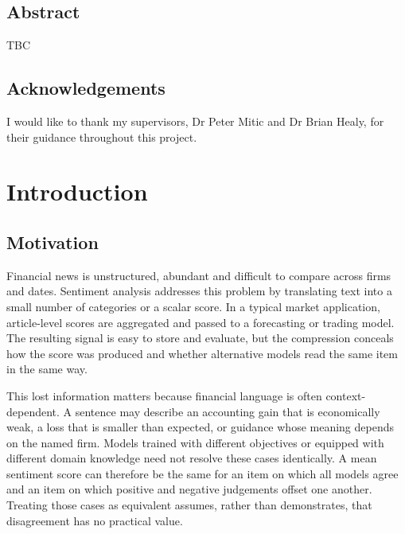 \documentclass[11pt,a4paper,oneside]{book}
\newif\ifshowdraftnotes
\newcommand{\draftnote}[1]{%
  \ifshowdraftnotes
    \par\smallskip
    \noindent{\color{draftgrey}\small\itshape Drafting note: #1\par}
    \smallskip
  \fi
}
\begin{document}
\section*{Abstract}

TBC

\draftnote{Add the final sample sizes, principal effect estimates, uncertainty intervals and direct answer to the research question after the registered results are frozen.}

\newpage

\section*{Acknowledgements}

I would like to thank my supervisors, Dr Peter Mitic and Dr Brian Healy, for their guidance throughout this project.

\newpage

\setcounter{tocdepth}{2}
\cleardoublepage
\tableofcontents
\cleardoublepage
\listoffigures
\cleardoublepage
\listoftables

\mainmatter

\chapter{Introduction}
\label{ch:introduction}

\section{Motivation}
\label{sec:motivation}

Financial news is unstructured, abundant and difficult to compare across firms and dates.
Sentiment analysis addresses this problem by translating text into a small number of categories or a scalar score.
In a typical market application, article-level scores are aggregated and passed to a forecasting or trading model.
The resulting signal is easy to store and evaluate, but the compression conceals how the score was produced and whether alternative models read the same item in the same way.

This lost information matters because financial language is often context-dependent.
A sentence may describe an accounting gain that is economically weak, a loss that is smaller than expected, or guidance whose meaning depends on the named firm.
Models trained with different objectives or equipped with different domain knowledge need not resolve these cases identically.
A mean sentiment score can therefore be the same for an item on which all models agree and an item on which positive and negative judgements offset one another.
Treating those cases as equivalent assumes, rather than demonstrates, that disagreement has no practical value.
\end{document}
